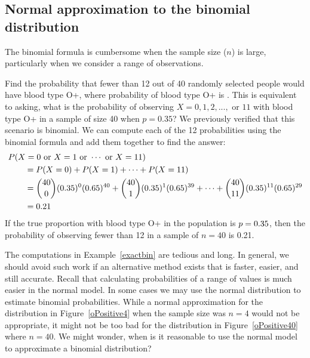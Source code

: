 



\D{\newpage}
\subsection{Normal approximation to the binomial distribution}


The binomial formula is cumbersome when the sample size ($n$) is large, particularly when we consider a range of observations.

\begin{examplewrap}
\begin{nexample}
{Find the probability that fewer than 12 out of 40 randomly selected people would have blood type O+, where probability of blood type O+ is \oposprob{}.}
This is equivalent to asking, what is the probability of observing $X=0, 1, 2, ..., \text{ or } 11$ with blood type O+ in a sample of size 40 when $p=0.35$?  We previously verified that this scenario is binomial.  We can compute each of the 12 probabilities using the binomial formula and add them together to find the answer:
 \begin{align*}
  &P(X=0\text{ or }X=1\text{ or }\cdots\text{ or } X=11) \\
	&\qquad = P(X=0) + P(X=1) + \cdots + P(X=11) \\
	&\qquad = {40\choose 0}(0.35{})^0(0.65{})^{40} + {40\choose 1}(0.35{})^1(0.65{})^{39} + \cdots + {40\choose 11}(0.35{})^{11}(0.65{})^{29}\\
	&\qquad = 0.21
  \end{align*}
If the true proportion with blood type O+ in the population is $p = 0.35{}$, then the probability of observing fewer than 12 in a sample of $n = 40$ is 0.21.
\end{nexample}
\end{examplewrap}
\label{exactbin}

The computations in Example~\ref{exactbin} are tedious and long.  In general, we should avoid such work if an alternative method exists that is faster, easier, and still accurate. Recall that calculating probabilities of a range of values is much easier in the normal model. In some cases we may use the normal distribution to estimate binomial probabilities. While a normal approximation for the distribution in Figure~\ref{oPositive4} when the sample size was $n = 4$ would not be appropriate, it might not be too bad for the distribution in Figure~\ref{oPositive40} where $n = 40$.  We might wonder, when is it reasonable to use the normal model to approximate a binomial distribution?

